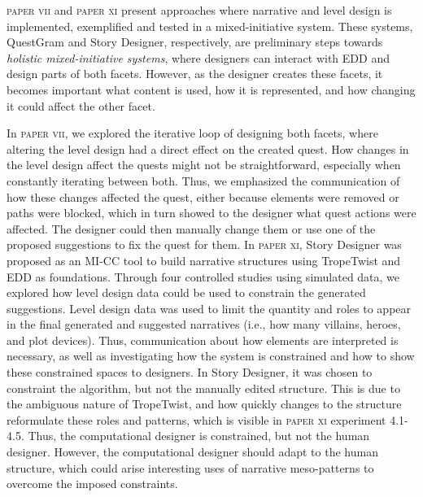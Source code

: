 \textsc{paper vii} and \textsc{paper xi} present approaches where narrative and level design is implemented, exemplified and tested in a mixed-initiative system. These systems, QuestGram and Story Designer, respectively, are preliminary steps towards \textit{holistic mixed-initiative systems}, where designers can interact with EDD and design parts of both facets. However, as the designer creates these facets, it becomes important what content is used, how it is represented, and how changing it could affect the other facet.

In \textsc{paper vii}, we explored the iterative loop of designing both facets, where altering the level design had a direct effect on the created quest. How changes in the level design affect the quests might not be straightforward, especially when constantly iterating between both. Thus, we emphasized the communication of how these changes affected the quest, either because elements were removed or paths were blocked, which in turn showed to the designer what quest actions were affected. The designer could then manually change them or use one of the proposed suggestions to fix the quest for them. In \textsc{paper xi}, Story Designer was proposed as an MI-CC tool to build narrative structures using TropeTwist and EDD as foundations. Through four controlled studies using simulated data, we explored how level design data could be used to constrain the generated suggestions. Level design data was used to limit the quantity and roles to appear in the final generated and suggested narratives (i.e., how many villains, heroes, and plot devices). Thus, communication about how elements are interpreted is necessary, as well as investigating how the system is constrained and how to show these constrained spaces to designers. In Story Designer, it was chosen to constraint the algorithm, but not the manually edited structure. This is due to the ambiguous nature of TropeTwist, and how quickly changes to the structure reformulate these roles and patterns, which is visible in \textsc{paper xi} experiment 4.1-4.5. Thus, the computational designer is constrained, but not the human designer. However, the computational designer should adapt to the human structure, which could arise interesting uses of narrative meso-patterns to overcome the imposed constraints.




